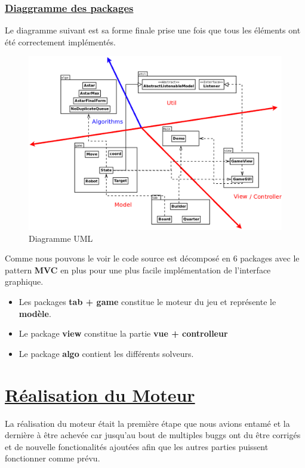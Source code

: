 \documentclass[12pt]{article}
\begin{document}
	\subsubsection{\underline{Diaggramme des packages}}
	Le diagramme suivant est sa forme finale prise une fois que tous les éléments ont été correctement implémentés.\\
	
	\begin{figure}[h!]
		\begin{center}
			\includegraphics[width=1\textwidth]{Images/package.png}
		\end{center}
		\caption{Diagramme UML}
		\label{DU}
	\end{figure}
	Comme nous pouvons le voir le code source est décomposé en 6 packages avec le pattern \textbf{MVC} en plus pour une plus facile
	implémentation de l'interface graphique.
	\begin{itemize}
		\item Les packages \textbf{tab + game} constitue le moteur du jeu et représente le \textbf{modèle}.
		\item Le package \textbf{view} constitue la partie \textbf{vue + controlleur}
		\item Le package \textbf{algo} contient les différents solveurs.
	\end{itemize}

	\section{\underline{Réalisation du Moteur}}
	La réalisation du moteur était la première étape que nous avions entamé et la dernière à être achevée car jusqu'au bout de 
	multiples buggs ont du être corrigés et de nouvelle fonctionalités ajoutées afin que les autres parties puissent fonctionner
	comme prévu.
\end{document}

